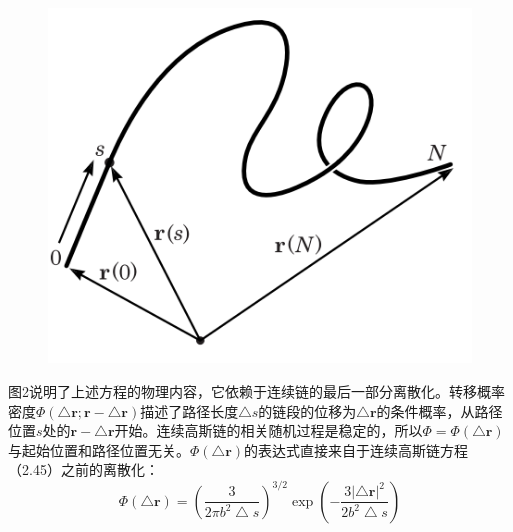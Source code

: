 \documentclass{article}
\begin{document}
\begin{figure}[H]
\centering
\includegraphics[scale=0.7]{./figures/1.png}
\caption{}
\end{figure}

图2说明了上述方程的物理内容，它依赖于连续链的最后一部分离散化。转移概率密度$\Phi(\bigtriangleup \mathbf{r};\mathbf{r}-\bigtriangleup \mathbf{r})$描述了路径长度$\bigtriangleup s$的链段的位移为$\bigtriangleup \mathbf{r}$的条件概率，从路径位置$s$处的$\mathbf{r}-\bigtriangleup \mathbf{r}$开始。连续高斯链的相关随机过程是稳定的，所以$\Phi =\Phi(\bigtriangleup \mathbf{r})$与起始位置和路径位置无关。$\Phi(\bigtriangleup \mathbf{r})$的表达式直接来自于连续高斯链方程（2.45）之前的离散化：
$$\Phi(\bigtriangleup \mathbf{r})=\left( \frac{3}{2\pi b^2 \bigtriangleup s} \right)^{3/2}\exp \left(- \frac{3\left| \bigtriangleup \mathbf{r} \right|^2}{2b^2 \bigtriangleup s} \right)$$
\end{document}
